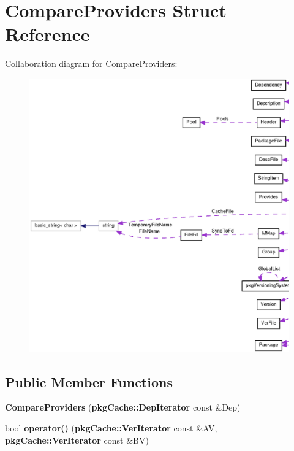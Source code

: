 \section{\-Compare\-Providers \-Struct \-Reference}
\label{structCompareProviders}


\-Collaboration diagram for \-Compare\-Providers\-:
\nopagebreak
\begin{figure}[H]
\begin{center}
\leavevmode
\includegraphics[width=350pt]{structCompareProviders__coll__graph}
\end{center}
\end{figure}
\subsection*{\-Public \-Member \-Functions}
\begin{DoxyCompactItemize}
\item 
{\bfseries \-Compare\-Providers} ({\bf pkg\-Cache\-::\-Dep\-Iterator} const \&\-Dep)\label{structCompareProviders_ab09dff55ec98a05eb73cabbc53dddce2}

\item 
bool {\bfseries operator()} ({\bf pkg\-Cache\-::\-Ver\-Iterator} const \&\-A\-V, {\bf pkg\-Cache\-::\-Ver\-Iterator} const \&\-B\-V)\label{structCompareProviders_a5138c47c21b626e6dfaff94a6bda0ba4}

\end{DoxyCompactItemize}
